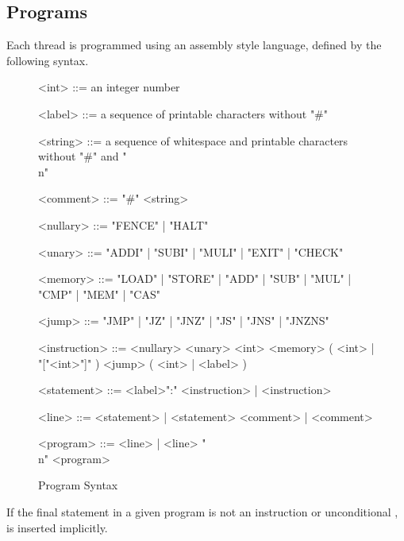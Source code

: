 
\subsection*{Programs}

Each thread is programmed using an assembly style language, defined by the following syntax.

\begin{figure}[!h]
\begin{grammar}
\small

<int> ::= an integer number

<label> ::= a sequence of printable characters without "#"

<string> ::= a sequence of whitespace and printable characters without "#" and "\\n"

<comment> ::= "#" <string>

<nullary> ::= "FENCE" | "HALT"

<unary> ::= "ADDI" | "SUBI" | "MULI" | "EXIT" | "CHECK"

<memory> ::= "LOAD" | "STORE" | "ADD" | "SUB" | "MUL" | "CMP" | "MEM" | "CAS"

<jump> ::= "JMP" | "JZ" | "JNZ" | "JS" | "JNS" | "JNZNS"

<instruction> ::= <nullary>
\alt <unary> <int>
\alt <memory> ( <int> | "["<int>"]" )
\alt <jump> ( <int> | <label> )

<statement> ::= <label>":" <instruction> | <instruction>

<line> ::= <statement> | <statement> <comment> | <comment>

<program> ::= <line> | <line> "\\n" <program>
\end{grammar}
\caption{Program Syntax}
\label{fig:syntax:program}
\end{figure}

If the final statement in a given program is not an  instruction or unconditional ,   is inserted implicitly.
